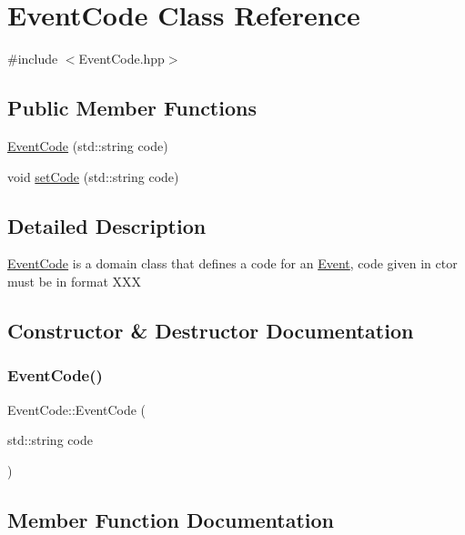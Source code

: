 \hypertarget{class_event_code}{}\section{Event\+Code Class Reference}
\label{class_event_code}


{\ttfamily \#include $<$Event\+Code.\+hpp$>$}

\subsection*{Public Member Functions}
\begin{DoxyCompactItemize}
\item 
\mbox{\hyperlink{class_event_code_a7c33d50827136d4cb628cf48b2113526}{Event\+Code}} (std\+::string code)
\item 
void \mbox{\hyperlink{class_event_code_a355ba0ab9a962fc06707ac7ee732bc8a}{set\+Code}} (std\+::string code)
\end{DoxyCompactItemize}


\subsection{Detailed Description}
\mbox{\hyperlink{class_event_code}{Event\+Code}} is a domain class that defines a code for an \mbox{\hyperlink{class_event}{Event}}, code given in ctor must be in format X\+XX 

\subsection{Constructor \& Destructor Documentation}
\mbox{\label{class_event_code_a7c33d50827136d4cb628cf48b2113526}} 
\subsubsection{\texorpdfstring{EventCode()}{EventCode()}}
{\footnotesize\ttfamily Event\+Code\+::\+Event\+Code (\begin{DoxyParamCaption}\item[{std\+::string}]{code }\end{DoxyParamCaption})}



\subsection{Member Function Documentation}
\mbox{\label{class_event_code_a355ba0ab9a962fc06707ac7ee732bc8a}} 
